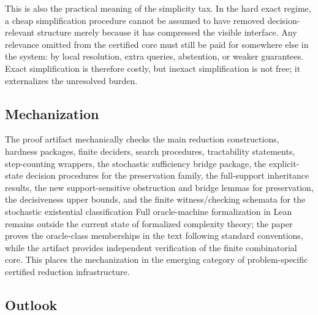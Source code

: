 This is also the practical meaning of the simplicity tax. In the hard exact regime, a cheap simplification procedure cannot be assumed to have removed decision-relevant structure merely because it has compressed the visible interface. Any relevance omitted from the certified core must still be paid for somewhere else in the system: by local resolution, extra queries, abstention, or weaker guarantees. Exact simplification is therefore costly, but inexact simplification is not free; it externalizes the unresolved burden.

\subsection*{Mechanization}

The proof artifact mechanically checks the main reduction constructions, hardness packages, finite deciders, search procedures, tractability statements, step-counting wrappers, the stochastic sufficiency bridge package, the explicit-state decision procedures for the preservation family, the full-support inheritance results, the new support-sensitive obstruction and bridge lemmas for preservation, the decisiveness upper bounds, and the finite witness/checking schemata for the stochastic existential classification  Full oracle-machine formalization in Lean remains outside the current state of formalized complexity theory; the paper proves the oracle-class memberships in the text following standard conventions, while the artifact provides independent verification of the finite combinatorial core. This places the mechanization in the emerging category of problem-specific certified reduction infrastructure.

\subsection*{Outlook}

